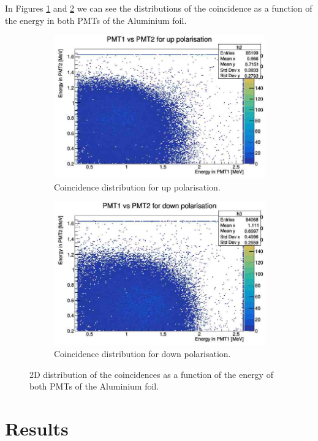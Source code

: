 \documentclass[10pt,swedish, openany]{book}
\begin{document}
In Figures \ref{fig:unup} and \ref{fig:undown} we can see the distributions of the coincidence as a function of the energy in both PMTs of the Aluminium foil.

\begin{figure}[H]
\begin{subfigure}{.5\textwidth}
  \centering
  \includegraphics[width=.8\linewidth]{unpolup.jpg}  
  \caption{Coincidence distribution for up polarisation.}
  \label{fig:unup}
\end{subfigure}
\begin{subfigure}{.5\textwidth}
  \centering
  \includegraphics[width=.8\linewidth]{unPoldown.jpg}  
  \caption{Coincidence distribution for down polarisation.}
  \label{fig:undown}
\end{subfigure}
\caption{2D distribution of the coincidences as a function of the energy of both PMTs of the Aluminium foil.}
\label{fig:unpol}
\end{figure}

\section{Results}
\end{document}
